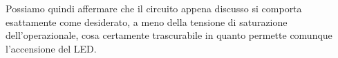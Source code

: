 \begin{minipage}{0.45\textwidth}
\begin{figure}[H]
    \end{figure}
\end{minipage}

Possiamo quindi affermare che il circuito appena discusso si comporta esattamente come
desiderato, a meno della tensione di saturazione dell'operazionale, cosa certamente
trascurabile in quanto permette comunque l'accensione del LED.

